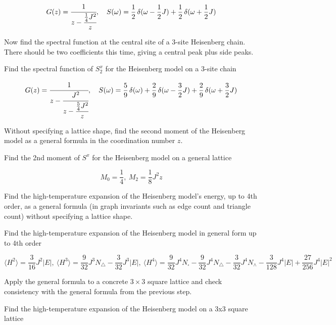 \documentclass[dvipdfmx]{article}
\begin{document}
\begin{equation}
  G(z) = \cfrac{1}{z - \cfrac{\frac{1}{4} J^{2}}{z}},\quad S(\omega) = \frac{1}{2}\,\delta(\omega - \frac{1}{2} J) + \frac{1}{2}\,\delta(\omega + \frac{1}{2} J)
  \label{eq:E5}
\end{equation}

Now find the spectral function at the central site of a 3-site Heisenberg chain. There should be two coefficients this time, giving a central peak plus side peaks.

Find the spectral function of $S^x_2$ for the Heisenberg model on a 3-site chain

\begin{equation}
  G(z) = \cfrac{1}{z - \cfrac{J^{2}}{z - \cfrac{\frac{5}{4} J^{2}}{z}}},\quad S(\omega) = \frac{5}{9}\,\delta(\omega) + \frac{2}{9}\,\delta(\omega - \frac{3}{2} J) + \frac{2}{9}\,\delta(\omega + \frac{3}{2} J)
  \label{eq:E6}
\end{equation}

Without specifying a lattice shape, find the second moment of the Heisenberg model as a general formula in the coordination number $z$.

Find the 2nd moment of $S^x$ for the Heisenberg model on a general lattice

\begin{equation}
  M_0 = \frac{1}{4},\ M_2 = \frac{1}{8} J^{2} z
  \label{eq:E7}
\end{equation}

Find the high-temperature expansion of the Heisenberg model's energy, up to 4th order, as a general formula (in graph invariants such as edge count and triangle count) without specifying a lattice shape.

Find the high-temperature expansion of the Heisenberg model in general form up to 4th order

\begin{equation}
  \langle H^2 \rangle = \frac{3}{16} J^{2} |E|,\ \langle H^3 \rangle = \frac{9}{32} J^{3} N_\triangle - \frac{3}{32} J^{3} |E|,\ \langle H^4 \rangle = \frac{9}{32} J^{4} N_\square - \frac{9}{32} J^{4} N_\triangle - \frac{3}{32} J^{4} N_\wedge - \frac{3}{128} J^{4} |E| + \frac{27}{256} J^{4} |E|^{2}
  \label{eq:E8}
\end{equation}

Apply the general formula to a concrete $3\times3$ square lattice and check consistency with the general formula from the previous step.

Find the high-temperature expansion of the Heisenberg model on a 3x3 square lattice
\end{document}
